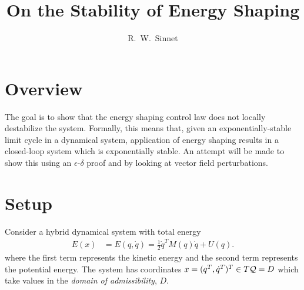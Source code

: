 \documentclass[twocolumn]{article}
\author{R.~W.~Sinnet}
\title{On the Stability of Energy Shaping}
\begin{document}
\maketitle
\thispagestyle{fancy}

\section*{Overview}
The goal is to show that the energy shaping control law does not locally destabilize the system.
%
Formally, this means that, given an exponentially-stable limit cycle in a dynamical system, application of energy shaping results in a closed-loop system which is exponentially stable.
%
An attempt will be made to show this using an $\epsilon$-$\delta$ proof and by looking at vector field perturbations.

\section{Setup}

Consider a hybrid dynamical system with total energy
\begin{align*}
  E(x) &= E(q, \dot q) = \frac{1}{2} {\dot q}^{T} M(q) {\dot q} + U(q).
\end{align*}
where the first term represents the kinetic energy and the second term represents the potential energy.
%
The system has coordinates $x = (q^T, \dot{q}^T)^T \in T\mathcal{Q} = D$ which take values in the {\em domain of admissibility}, $D$.
\end{document}
